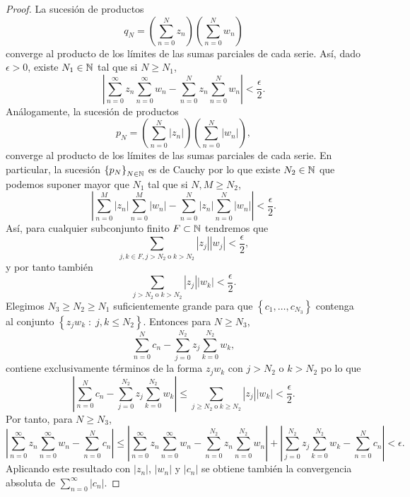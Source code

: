 \begin{proof}
La sucesión de productos
\[q_{N}=\left(\sum^{N}_{n = 0}z_{n}\right)\left(\sum^{N}_{n = 0}w_{n}\right)\]
converge al producto de los límites de las sumas parciales de cada serie. Así, dado $\displaystyle \epsilon > 0 $, existe $\displaystyle N_{1} \in \mathbb{N} $ tal que si $\displaystyle N \geq N_{1} $,
\[ \left|\sum^{\infty}_{n = 0}z_{n}\sum^{\infty}_{n = 0}w_{n}-\sum^{N}_{n = 0}z_{n}\sum^{N}_{n = 0}w_{n}\right| < \frac{\epsilon }{2} .\]
Análogamente, la sucesión de productos
\[p_{N}=\left(\sum^{N}_{n=0} \left|z_{n}\right|\right)\left(\sum^{N}_{n=0} \left|w_{n}\right|\right) ,\]
converge al producto de los límites de las sumas parciales de cada serie. En particular, la sucesión $\displaystyle \left\{ p_{N}\right\} _{N\in\mathbb{N}} $ es de Cauchy por lo que existe $\displaystyle N_{2} \in \mathbb{N} $ que podemos suponer mayor que $\displaystyle N_{1} $ tal que si $\displaystyle N,M \geq N_{2}  $,
\[ \left|\sum^{M}_{n = 0} \left|z_{n}\right| \sum^{M}_{n = 0} \left|w_{n}\right|-\sum^{N}_{n = 0} \left|z_{n}\right| \sum^{N}_{n = 0} \left|w_{n}\right|\right| < \frac{\epsilon }{2} .\]
Así, para cualquier subconjunto finito $\displaystyle F \subset \mathbb{N} $ tendremos que 
\[\sum_{j,k\in F, j > N_{2} \; \text{o} \; k > N_{2}} \left|z_{j}\right| \left|w_{j}\right| <\frac{\epsilon }{2} ,\]
y por tanto también
\[\sum_{j > N_{2} \; \text{o} \; k > N_{2}} \left|z_{j}\right| \left|w_{k}\right| < \frac{\epsilon }{2} .\]
Elegimos $\displaystyle N_{3}\geq N_{2}\geq N_{1} $ suficientemente grande para que $\displaystyle \left\{ c_{1}, \ldots, c_{N_{3}}\right\}  $ contenga al conjunto $\displaystyle \left\{ z_{j}w_{k} \; : \; j,k \leq N_{2}\right\}  $. Entonces para $\displaystyle N \geq N_{3} $,
\[\sum^{N}_{n=0}c_{n}-\sum^{N_{2}}_{j = 0}z_{j}\sum^{N_{2}}_{k = 0}w_{k} ,\]
contiene exclusivamente términos de la forma $\displaystyle z_{j}w_{k} $ con $\displaystyle j > N_{2} $ o $\displaystyle k > N_{2} $ po lo que 
\[ \left|\sum^{N}_{n=0}c_{n}-\sum^{N_{2}}_{j = 0}z_{j}\sum^{N_{2}}_{k = 0}w_{k}\right| \leq \sum_{j \geq N_{2} \; \text{o} \; k \geq N_{2}} \left|z_{j}\right| \left|w_{k}\right| < \frac{\epsilon }{2} .\]
Por tanto, para $\displaystyle N \geq N_{3} $,
\[ \left|\sum^{\infty}_{n = 0}z_{n}\sum^{\infty}_{n = 0}w_{n}-\sum^{N}_{n = 0}c_{n}\right|\leq \left|\sum^{\infty}_{n = 0}z_{n}\sum^{\infty}_{n = 0}w_{n}-\sum^{N_{2}}_{n = 0}z_{n}\sum^{N_{2}}_{n = 0}w_{n}\right| 
+ \left|\sum^{N_{2}}_{j=0}z_{j}\sum^{N_{2}}_{k=0}w_{k}-\sum^{N}_{n = 0}c_{n}\right|<\epsilon.\]
Aplicando este resultado con $\displaystyle \left|z_{n}\right| $, $\displaystyle \left|w_{n}\right| $ y $\displaystyle \left|c_{n}\right| $ se obtiene también la convergencia absoluta de $\displaystyle \sum^{\infty}_{n = 0} \left|c_{n}\right| $. 
\end{proof}

